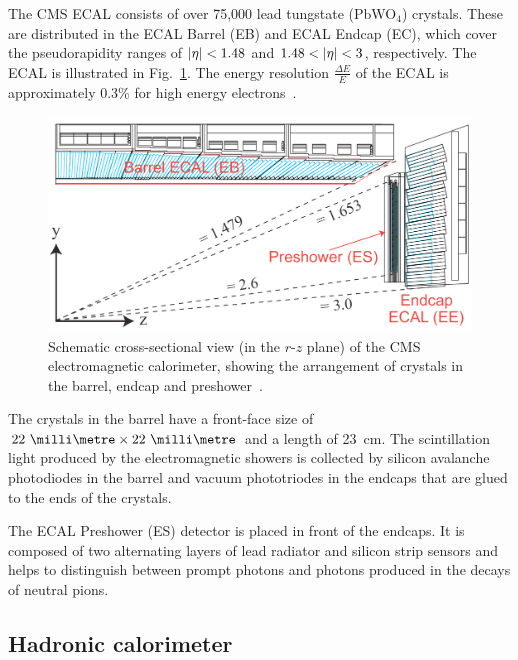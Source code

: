 
The CMS ECAL consists of over 75,000 lead tungstate (PbWO$_4$) crystals. These 
are distributed in the ECAL Barrel (EB) and ECAL Endcap (EC), which cover the 
pseudorapidity ranges of $|\eta|<1.48$ and $1.48 < |\eta| < 3$, 
respectively. The ECAL is illustrated in Fig.~\ref{fig:ecal}. 
The energy resolution $\frac{\Delta E}{E}$ of the ECAL is approximately 0.3\% 
for high energy electrons~\cite{cms}.

\begin{figure}
	\begin{center}
		\includegraphics[width=0.7\linewidth]{figs/detector/ecal}
	\end{center}
	\caption{Schematic cross-sectional view (in the $r$-$z$ plane) of the CMS 
		electromagnetic calorimeter, showing the arrangement of crystals in the 
		barrel, 
		endcap and preshower~\cite{cms}.}
	\label{fig:ecal}
\end{figure}

The crystals in the barrel have a front-face size of 
$22~\milli\metre \times 22~\milli\metre$ and a length of 23~cm. The 
scintillation 
light produced by the electromagnetic showers is collected by silicon 
avalanche photodiodes in the barrel and vacuum phototriodes in the endcaps that 
are glued to the ends of the crystals.

The ECAL Preshower (ES) detector is placed in front of the endcaps. It is 
composed of two alternating layers of lead radiator and silicon strip sensors 
and helps to distinguish between prompt photons and photons produced in the 
decays of neutral pions.%

\subsection{Hadronic calorimeter}

